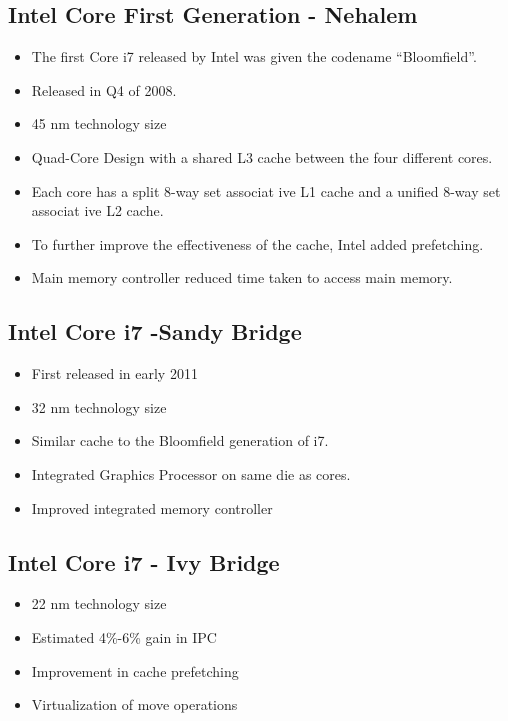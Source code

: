 \subsection{Intel Core First Generation - Nehalem}

\begin{itemize}
	\item The first Core i7 released by Intel was given the codename “Bloomfield”.
	\item Released in Q4 of 2008.
	\item 45 nm technology size
	\item Quad-Core Design with a shared L3 cache between the four different cores.
	\item Each core has a split  8-way set  associat ive L1 cache and a unified 8-way set  associat ive L2 cache.
	\item To further improve the effectiveness of the cache, Intel added prefetching.
	\item Main memory controller reduced time taken to access main memory.
\end{itemize}

\subsection{Intel  Core i7 -Sandy Bridge}

\begin{itemize}
	\item First released in early 2011
	\item32 nm technology size
	\item Similar cache to the Bloomfield generation of i7.
	\item Integrated Graphics Processor on same die as cores.
	\item Improved integrated memory controller
\end{itemize}


\subsection{Intel Core i7 - Ivy Bridge}

\begin{itemize}
	\item 22 nm technology size
	\item Estimated 4\%-6\% gain in IPC
	\item Improvement in cache prefetching
	\item Virtualization of move operations
\end{itemize}

